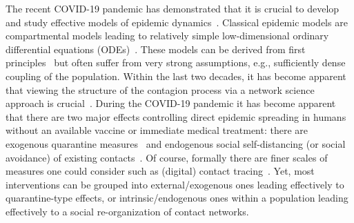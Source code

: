 \documentclass[12pt]{article}
\begin{document}
The recent COVID-19 pandemic has demonstrated that it is crucial to develop and study effective models of epidemic dynamics~\cite{AndersonMay}. Classical epidemic models are compartmental models leading to relatively simple low-dimensional ordinary differential equations (ODEs)~\cite{BrauervandenDriesscheWu,DiekmannHeesterbeek}. These models can be derived from first principles~\cite{KissMillerSimon} but often suffer from very strong assumptions, e.g., sufficiently dense coupling of the population. Within the last two decades, it has become apparent that viewing the structure of the contagion process via a network science approach is crucial~\cite{Pastor-SatorrasVespignani,ColizzaBarratBarthelemyVespignani,Durrett,HouseKeeling,Pastor-Satorrasetal}. During the COVID-19 pandemic it has become apparent that there are two major effects controlling direct epidemic spreading in humans without an available vaccine or immediate medical treatment: there are exogenous quarantine measures~\cite{MaierBrockmann,Kucharskietal} and endogenous social self-distancing (or social avoidance) of existing contacts~\cite{Giordanoetal}. Of course, formally there are finer scales of measures one could consider such as (digital) contact tracing~\cite{Ferrettietal,Kretzschmaretal}. Yet, most interventions can be grouped into external/exogenous ones leading effectively to quarantine-type effects, or intrinsic/endogenous ones within a population leading effectively to a social re-organization of contact networks. 
\end{document}
